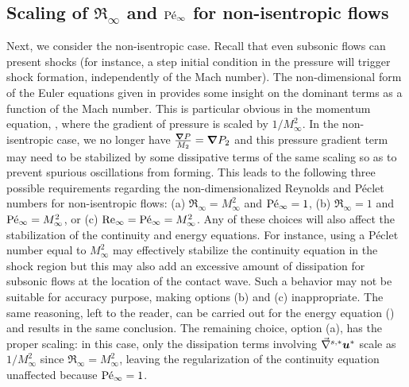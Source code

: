\subsection{Scaling of $\Re_\infty$ and $\textrm{P\'e}_\infty$ for non-isentropic flows} \label{sec:nonisentropic}

Next, we consider the non-isentropic case. Recall that even subsonic flows can present shocks (for instance, a step initial condition in the pressure will trigger shock formation, independently of the Mach number). The non-dimensional form of the Euler equations given in  provides some insight on the dominant terms as a function of the Mach number. This is particular obvious in the momentum equation, , where the gradient of pressure is scaled by $1/M_\infty^2$. In the non-isentropic case, we no longer have $\frac{\boldsymbol{\nabla} P}{M_2}=\boldsymbol{\nabla} P_2$ and this pressure gradient term may need to be stabilized by some dissipative terms of the same scaling so as to prevent spurious oscillations from forming. This leads to the following three possible requirements regarding the non-dimensionalized Reynolds and P\'eclet numbers for non-isentropic flows: 
(a) $\Re_\infty = M_\infty^2$ and $\textrm{P\'e}_\infty = 1$,
(b) $\Re_\infty = 1$ and $\textrm{P\'e}_\infty = M_\infty^2$, or
(c) $\textrm{Re}_\infty = \textrm{P\'e}_\infty = M_\infty^2$. 
%
Any of these choices will also affect the stabilization of the continuity and energy equations. For instance, using a P\'eclet number equal to $M_\infty^2$ may effectively stabilize the continuity equation in the shock region but this may also add an excessive amount of dissipation for subsonic flows at the location of the contact wave. Such a behavior may not be suitable for accuracy purpose, making options (b) and (c) inappropriate. The same reasoning, left to the reader, can be carried out for the energy equation () and results in the same conclusion. The remaining choice, option (a), has the proper scaling: in this case, only the dissipation terms involving $\vec{\nabla}^{s,*} \boldsymbol u^*$ scale as $1/M_\infty^2$ since $\Re_\infty = M_\infty^2$, leaving the regularization of the continuity equation unaffected because $\textrm{P\'e}_\infty = 1$.
%
